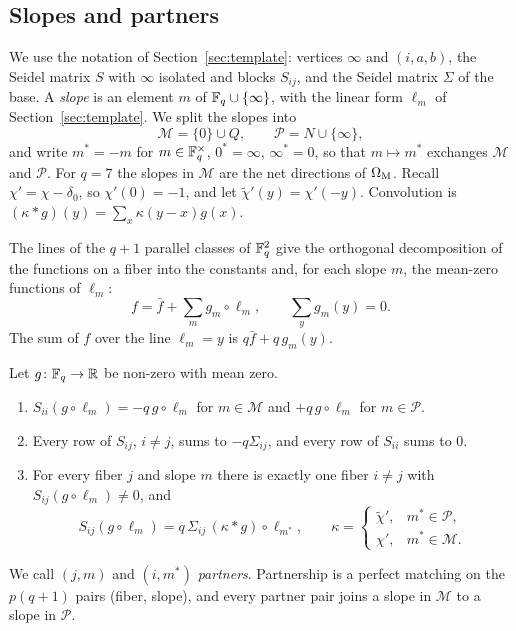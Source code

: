 \subsection{Slopes and partners}
We use the notation of Section~\ref{sec:template}: vertices $\infty$ and $(i,a,b)$, the Seidel matrix $S$ with $\infty$ isolated and blocks $S_{ij}$, and the Seidel matrix $\Sigma$ of the base.
A \emph{slope} is an element $m$ of $\mathbb{F}_q\cup\{\infty\}$, with the linear form $\ell_m$ of Section~\ref{sec:template}.
We split the slopes into
\[
\mathcal M=\{0\}\cup Q,\qquad \mathcal P=N\cup\{\infty\},
\]
and write $m^*=-m$ for $m\in\mathbb{F}_q^\times$, $0^*=\infty$, $\infty^*=0$, so that $m\mapsto m^*$ exchanges $\mathcal M$ and $\mathcal P$.
For $q=7$ the slopes in $\mathcal M$ are the net directions of $\Omega_{\mathrm M}$.
Recall $\chi'=\chi-\delta_0$, so $\chi'(0)=-1$, and let $\tilde\chi'(y)=\chi'(-y)$.
Convolution is $(\kappa*g)(y)=\sum_x\kappa(y-x)g(x)$.

The lines of the $q+1$ parallel classes of $\mathbb{F}_q^2$ give the orthogonal decomposition of the functions on a fiber into the constants and, for each slope $m$, the mean-zero functions of $\ell_m$:
\begin{equation}\label{eq:slopes}
f=\bar f+\sum_{m}g_m\circ\ell_m,\qquad \textstyle\sum_y g_m(y)=0.
\end{equation}
The sum of $f$ over the line $\ell_m=y$ is $q\bar f+q\,g_m(y)$.

\begin{lemma}\label{lem:slopes}
Let $g\colon\mathbb{F}_q\to\mathbb R$ be non-zero with mean zero.
\begin{enumerate}
\item $S_{ii}(g\circ\ell_m)=-q\,g\circ\ell_m$ for $m\in\mathcal M$ and $+q\,g\circ\ell_m$ for $m\in\mathcal P$.
\item Every row of $S_{ij}$, $i\ne j$, sums to $-q\Sigma_{ij}$, and every row of $S_{ii}$ sums to $0$.
\item For every fiber $j$ and slope $m$ there is exactly one fiber $i\ne j$ with $S_{ij}(g\circ\ell_m)\ne0$, and
\[
S_{ij}(g\circ\ell_m)=q\,\Sigma_{ij}\,(\kappa*g)\circ\ell_{m^*},\qquad \kappa=\begin{cases}\tilde\chi',& m^*\in\mathcal P,\\ \chi',& m^*\in\mathcal M.\end{cases}
\]
\end{enumerate}
We call $(j,m)$ and $(i,m^*)$ \emph{partners}.
Partnership is a perfect matching on the $p(q+1)$ pairs (fiber, slope), and every partner pair joins a slope in $\mathcal M$ to a slope in $\mathcal P$.
\end{lemma}

